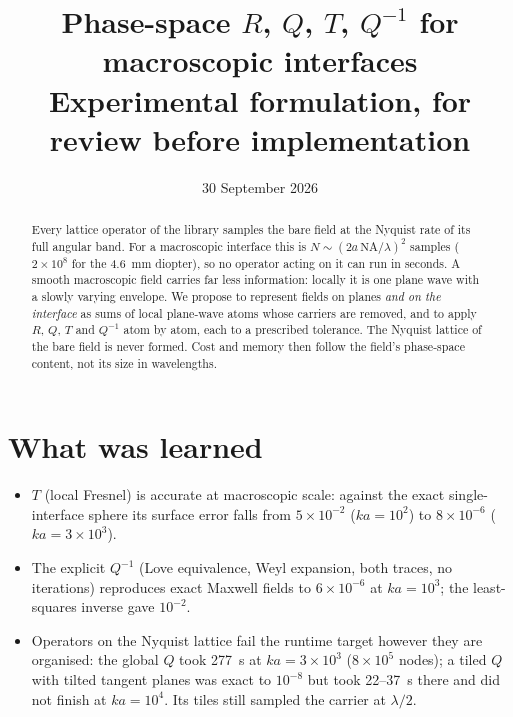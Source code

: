 \documentclass[11pt,a4paper]{article}
\title{Phase-space $R$, $Q$, $T$, $Q^{-1}$ for macroscopic interfaces\\[2pt]
\large Experimental formulation, for review before implementation}
\date{30 September 2026}
\begin{document}
\maketitle

\begin{abstract}
Every lattice operator of the library samples the bare field at the Nyquist
rate of its full angular band. For a macroscopic interface this is
$N\sim(2a\,\mathrm{NA}/\lambda)^2$ samples ($2\times10^8$ for the 4.6~mm
diopter), so no operator acting on it can run in seconds. A smooth macroscopic
field carries far less information: locally it is one plane wave with a slowly
varying envelope. We propose to represent fields on planes \emph{and on the
interface} as sums of local plane-wave atoms whose carriers are removed, and to
apply $R$, $Q$, $T$ and $Q^{-1}$ atom by atom, each to a prescribed tolerance.
The Nyquist lattice of the bare field is never formed. Cost and memory then
follow the field's phase-space content, not its size in wavelengths.
\end{abstract}

\section{What was learned}
\begin{itemize}
\item $T$ (local Fresnel) is accurate at macroscopic scale: against the exact
single-interface sphere its surface error falls from $5\times10^{-2}$
($ka=10^2$) to $8\times10^{-6}$ ($ka=3\times10^3$).
\item The explicit $Q^{-1}$ (Love equivalence, Weyl expansion, both traces, no
iterations) reproduces exact Maxwell fields to $6\times10^{-6}$ at $ka=10^3$;
the least-squares inverse gave $10^{-2}$.
\item Operators on the Nyquist lattice fail the runtime target however they
are organised: the global $Q$ took 277~s at $ka=3\times10^3$ ($8\times10^5$
nodes); a tiled $Q$ with tilted tangent planes was exact to $10^{-8}$ but took
22--37~s there and did not finish at $ka=10^4$. Its tiles still sampled the
carrier at $\lambda/2$.
\end{itemize}
\end{document}
